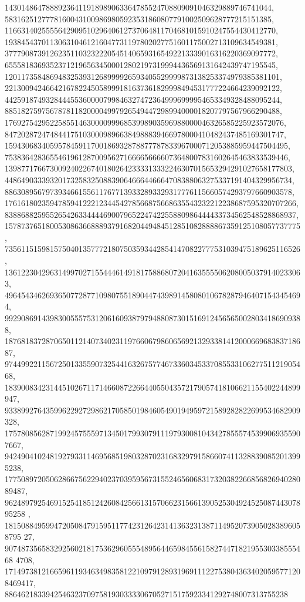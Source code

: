 \documentclass[12pt]{article}
\begin{document}
14301486478889236411918989063364785524708809091046329889746741044, 
58316251277781600431009869805923531860807791002509628777215151385, 
116631402555564290951029640612737064811704681015910247554430412770, 
193845437011306310461216047731197802027751601175002713109634549381, 
377790873912623511032322205451406593165492213339016316220369097772, 
655581836935237121965634500012802197319994436569131642439747195545, 
1201173584869483253931268999926593405529999873138253374979385381101, 
2213009424664216782245058999181637361829998494531777224664239092122, 
4425918749328444553600007998463274723649996999954653349328488095244, 
8851827597567878118200004997926549447298994000018207797567966290488, 
17692754295225855146300009996853998903596988000046326585225923572076, 
84720287247484417510300098966384988839466978000410482437485169301747, 
159430683405957845911700186932878877787833967000712053885959447504495, 
753836428365546196128700956271666656666073648007831602645463833539446, 
1398771766730092402267401802642333313332246307015653294291027658177803, 
4486490333932017325832508839064666446664708388063275337191404329956734, 
8863089567973934661556117677139332893329317776115660574293797660903578, 
17616180235947859412221234454278566875668635543232212238687595320707266, 
83886882595526542633444469007965224742255880986444433734562548528868937, 
157873765180053086366888937916820449484512851082888867359125108057737775, 
735611515981575040135777218075035934428541470822777531039475189625116526, 
1361223042963149970271554446149181758868072041635555062080050379140233063, 
4964543462693650772877109807551890447439891458080106782879464071543454694, 
9929086914398300555753120616093879794880873015169124565650028034186909388, 
18768183728706501121407340231197660679860656921329338141200066968383718687, 
97449922115672501335590732544163267577467336034533708553310627751121905468, 
183900834231445102671171466087226644055043572179057418106621155402244899947, 
933899276435996229272986217058501984605490194959721589282822699534682909328, 
1757808562871992457555971345017993079111979300810434278555745399069355907667, 
9424904102481927933114695685198032870231683297915866074113288390852013995238, 
17750897205062866756229402370395956731552465606831732038226685682694028089487,
 96248979254691525418512426084256613157066231566139052530492452508744307895258
, 1815088495994720508479159511774231264231413632313871149520739050283896058795
27, 90748735658329256021817536296055548956446598455615827447182195530338555468
4708, 171497381216659611934634983581221097912893196911122753804363402059577120
8469417, 886462183394254632370975819303333067052715175923341292748007313755238
\end{document}

